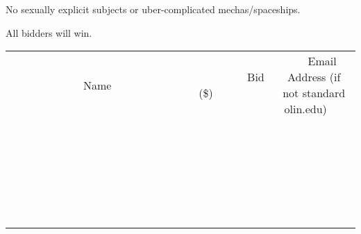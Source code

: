 \documentclass[11pt]{article}
\begin{document}
No sexually explicit subjects or uber-complicated mechas/spaceships.



All bidders will win. \\
					[6ex]
					\begin{tabular}{c c c}
						~~~~~~~~~~~~~Name~~~~~~~~~~~~~ & ~~~~~~~~~Bid (\$)~~~~~~~~~ & ~~~Email Address (if not standard olin.edu)~~~ \\
				
 & & \\
\hline
 & & \\
\hline
 & & \\
\hline
 & & \\
\hline
 & & \\
\hline
 & & \\
\hline
 & & \\
\hline
 & & \\
\hline
 & & \\
\hline
 & & \\
\hline
 & & \\
\hline
 & & \\
\hline
 & & \\
\hline
 & & \\
\hline
 & & \\
\hline
 & & \\
\hline
 & & \\
\hline
 & & \\
\hline
 & & \\
\hline
 & & \\
\hline
 & & \\
\hline
 & & \\
\hline
 & & \\
\hline
 & & \\
\hline
 & & \\
\hline
 & & \\
\hline
					\end{tabular}
					\clearpage
				
\end{document}
